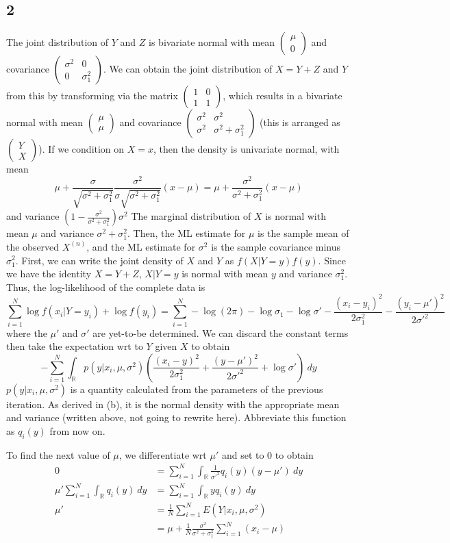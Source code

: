 \documentclass{article}
\newcommand{\openm}{\begin{pmatrix}}
\newcommand{\closem}{\end{pmatrix}}
\newcommand{\rn}{\mathbb{R}}
\begin{document}
\subsection*{2}
The joint distribution of $Y$ and $Z$ is bivariate normal with mean $\openm\mu\\0\closem$ and covariance $\openm \sigma^2&0\\0&\sigma_1^2\closem$. We can obtain the joint distribution of $X=Y+Z$ and $Y$ from this by transforming via the matrix $\openm 1&0\\1&1\closem$, which results in a bivariate normal with mean $\openm\mu\\\mu\closem$ and covariance $\openm\sigma^2&\sigma^2\\\sigma^2&\sigma^2+\sigma_1^2\closem$ (this is arranged as $\openm Y\\X\closem$).
If we condition on $X=x$, then the density is univariate normal, with mean 
\[\mu+\frac{\sigma}{\sqrt{\sigma^2+\sigma_1^2}}\frac{\sigma^2}{\sigma\sqrt{\sigma^2+\sigma_1^2}}(x-\mu)=\mu+\frac{\sigma^2}{\sigma^2+\sigma_1^2}(x-\mu)\]
and variance $\left(1-\frac{\sigma^2}{\sigma^2+\sigma_1^2}\right)\sigma^2$
The marginal distribution of $X$ is normal with mean $\mu$ and variance $\sigma^2+\sigma_1^2$. Then, the ML estimate for $\mu$ is the sample mean of the observed $X^{(n)}$, and the ML estimate for $\sigma^2$ is the sample covariance minus $\sigma_1^2$.
First, we can write the joint density of $X$ and $Y$ as $f(X|Y=y)f(y)$. Since we have the identity $X=Y+Z$, $X|Y=y$ is normal with mean $y$ and variance $\sigma_1^2$. Thus, the log-likelihood of the complete data is 
\[\sum_{i=1}^N\log f(x_i|Y=y_i)+\log f(y_i)=\sum_{i=1}^N-\log(2\pi)-\log\sigma_1-\log\sigma'-\frac{(x_i-y_i)^2}{2\sigma_1^2}-\frac{(y_i-\mu')^2}{2\sigma'^2}\]
where the $\mu'$ and $\sigma'$ are yet-to-be determined. We can discard the constant terms then take the expectation wrt to $Y$ given $X$ to obtain
\[-\sum_{i=1}^N\int_\rn p(y|x_i,\mu,\sigma^2)\left(\frac{(x_i-y)^2}{2\sigma_1^2}+\frac{(y-\mu')^2}{2\sigma'^2}+\log\sigma'\right)\ dy\]
$p(y|x_i, \mu, \sigma^2)$ is a quantity calculated from the parameters of the previous iteration. As derived in (b), it is the normal density with the appropriate mean and variance (written above, not going to rewrite here). Abbreviate this function as $q_i(y)$ from now on.

To find the next value of $\mu$, we differentiate wrt $\mu'$ and set to 0 to obtain
\begin{align*}
    0&=\sum_{i=1}^N\int_\rn \frac{1}{\sigma'^2}q_i(y)(y-\mu')\ dy\\
    \mu'\sum_{i=1}^N\int_{\rn}q_i(y)\ dy&=\sum_{i=1}^N\int_\rn yq_i(y)\ dy\\
    \mu'&=\frac{1}{N}\sum_{i=1}^NE(Y|x_i,\mu,\sigma^2)\\
        &=\mu+\frac{1}{N}\frac{\sigma^2}{\sigma^2+\sigma_1^2}\sum_{i=1}^N(x_i-\mu)\\
\end{align*}
\end{document}
